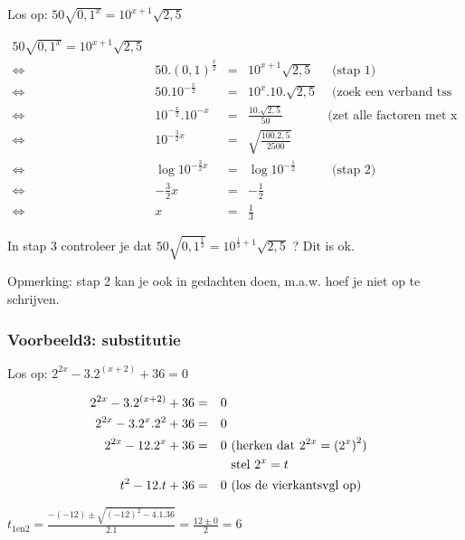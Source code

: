 Los op: ${\displaystyle 50\sqrt{0,1^{x}}=10^{x+1}\sqrt{2,5}}$

\[
{\displaystyle \begin{split}{\displaystyle 50\sqrt{0,1^{x}}=10^{x+1}\sqrt{2,5}}\\
\Longleftrightarrow & 50.\left(0,1\right)^{\frac{x}{2}} & = & 10^{x+1}\sqrt{2,5} & \text{ (stap 1)}\\
\Longleftrightarrow & 50.10^{-\frac{x}{2}} & = & 10^{x}.10.\sqrt{2,5} & \text{ (zoek een verband tss 0,1 en 10)}\\
\Longleftrightarrow & 10^{-\frac{x}{2}}.10^{-x} & = & \frac{10.\sqrt{2,5}}{50} & \textrm{(zet alle factoren met x bij elkaar)}\\
\Longleftrightarrow & 10^{-\frac{3}{2}x} & = & \sqrt{\frac{100.2,5}{2500}}\\
\Longleftrightarrow & \log10^{-\frac{3}{2}x} & = & \log10^{-\frac{1}{2}} & \text{ (stap 2)}\\
\Longleftrightarrow & -\frac{3}{2}x & = & -\frac{1}{2} & \text{}\\
\Longleftrightarrow & x & = & \frac{1}{3}
\end{split}
}
\]


In stap 3 controleer je dat ${\displaystyle 50\sqrt{0,1^{\frac{1}{3}}}=10^{\frac{1}{3}+1}\sqrt{2,5}}$
? Dit is ok.

Opmerking: stap 2 kan je ook in gedachten doen, m.a.w. hoef je niet
op te schrijven.


\subsubsection{Voorbeeld3: substitutie}

Los op: ${\displaystyle 2^{2x}-3.2^{(x+2)}+36=0}$

\[
{\displaystyle \begin{split}{\displaystyle 2^{2x}-3.2^{(x+2)}+36} & = & 0\\
{\displaystyle 2^{2x}-3.2^{x}.2^{2}+36} & = & 0\\
{\displaystyle 2^{2x}-12.2^{x}+36} & = & 0 & \text{ (herken dat \ensuremath{{\displaystyle 2^{2x}=\left(2^{x}\right)^{2}}})}\\
 &  &  & \text{ stel }2^{x}=t\\
{\displaystyle t^{2}-12.t+36} & = & 0 & \text{ (los de vierkantsvgl op)}
\end{split}
}
\]


${\displaystyle t_{1\textrm{en}2}=\frac{-(-12)\pm\sqrt{(-12)^{2}-4.1.36}}{2.1}=\frac{12\pm0}{2}=6}$

